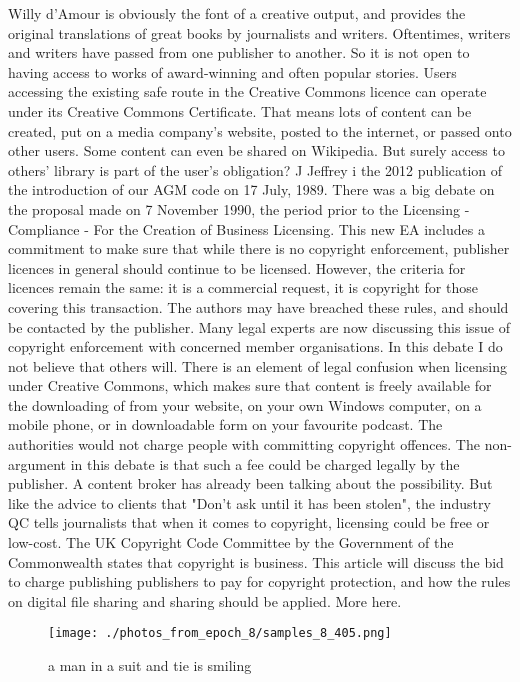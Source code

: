\documentclass{article}%
\begin{document}
Willy d'Amour is obviously the font of a creative output, and provides the original translations of great books by journalists and writers. Oftentimes, writers and writers have passed from one publisher to another. So it is not open to having access to works of award{-}winning and often popular stories. Users accessing the existing safe route in the Creative Commons licence can operate under its Creative Commons Certificate.\newline%
That means lots of content can be created, put on a media company's website, posted to the internet, or passed onto other users. Some content can even be shared on Wikipedia. But surely access to others' library is part of the user's obligation?\newline%
J Jeffrey\newline%
i\newline%
the 2012 publication of the introduction of our AGM code on 17 July, 1989.\newline%
There was a big debate on the proposal made on 7 November 1990, the period prior to the Licensing {-} Compliance {-} For the Creation of Business Licensing.\newline%
This new EA includes a commitment to make sure that while there is no copyright enforcement, publisher licences in general should continue to be licensed.\newline%
However, the criteria for licences remain the same: it is a commercial request, it is copyright for those covering this transaction. The authors may have breached these rules, and should be contacted by the publisher.\newline%
Many legal experts are now discussing this issue of copyright enforcement with concerned member organisations. In this debate I do not believe that others will.\newline%
There is an element of legal confusion when licensing under Creative Commons, which makes sure that content is freely available for the downloading of from your website, on your own Windows computer, on a mobile phone, or in downloadable form on your favourite podcast. The authorities would not charge people with committing copyright offences.\newline%
The non{-}argument in this debate is that such a fee could be charged legally by the publisher. A content broker has already been talking about the possibility.\newline%
But like the advice to clients that "Don't ask until it has been stolen", the industry QC tells journalists that when it comes to copyright, licensing could be free or low{-}cost.\newline%
The UK Copyright Code Committee by the Government of the Commonwealth states that copyright is business. This article will discuss the bid to charge publishing publishers to pay for copyright protection, and how the rules on digital file sharing and sharing should be applied. More here.\newline%

%


\begin{figure}[h!]%
\centering%
\texttt{[image: ./photos\_from\_epoch\_8/samples\_8\_405.png]}%
\caption{a man in a suit and tie is smiling}%
\end{figure}

%
\end{document}
